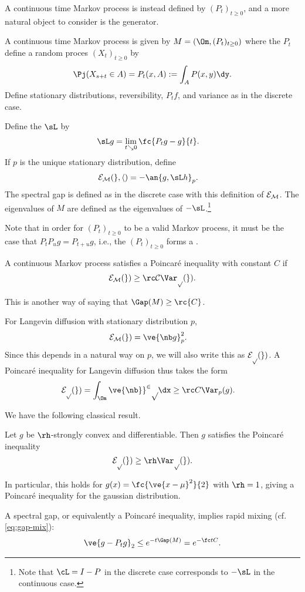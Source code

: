 A continuous time Markov process is instead defined by $(P_t)_{t\ge 0}$, and a more natural object to consider is the generator. 
\begin{df}
A continuous time Markov process is given by $M=(\Om, (P_t)_{t\ge 0})$ where the $P_t$ define a random proces $(X_t)_{t\ge 0}$ by
$$
\Pj(X_{s+t}\in A) = P_t(x,A) :=\int_A P(x,y)\dy.
$$
Define stationary distributions, reversibility, $P_tf$, and variance as in the discrete case.

Define the  $\sL$ by
\begin{align}
\sL g &= \lim_{t\searrow 0} \fc{P_t g - g}{t}.
\end{align}
If $p$ is the unique stationary distribution, define
\begin{align}
\cal E_M(g,h) &= -\an{g, \sL h}_p.
\end{align}
The spectral gap is defined as in the discrete case with this definition of $\cal E_M$. The eigenvalues of $M$ are defined as the eigenvalues of $-\sL$.\footnote{Note that $\cL=I-P$ in the discrete case corresponds to $-\sL$ in the continuous case.} 
\end{df}
Note that in order for $(P_t)_{t\ge 0}$ to be a valid Markov process, it must be the case that $P_tP_u g = P_{t+u}g$, i.e., the $(P_t)_{t\ge 0}$ forms a . 

%

\begin{df}
A continuous Markov process satisfies a Poincar\'e inequality with constant $C$ if
\begin{align}
\cal E_M(g) \ge \rc C\Var_p(g).
\end{align}
\end{df}
This is another way of saying that $\Gap(M)\ge \rc{C}$. 

For Langevin diffusion with stationary distribution $p$, 
\begin{align}
\cal E_M(g) &= \ve{\nb g}_p^2. 
\end{align}
Since this depends in a natural way on $p$, we will also write this as $\cal E_p(g)$. A Poincar\'e inequality for Langevin diffusion thus takes the form
\begin{align}
\cal E_p(g) = \int_{\Om} \ve{\nb g}^2 p\dx &\ge \rc C \Var_p(g).
\end{align}

We have the following classical result. 

\begin{thm}\label{thm:bakry-emery}
Let $g$ be $\rh$-strongly convex and differentiable. %
Then $g$ satisfies the Poincar\'e inequality
$$
\cal E_p(g) \ge \rh \Var_p(g).
$$

\end{thm}
In particular, this holds for $g(x)={\fc{\ve{x-\mu}^2}{2}}$ with $\rh = 1$, giving a Poincar\'e inequality for the gaussian distribution.

A spectral gap, or equivalently a Poincar\'e inequality, implies rapid mixing (cf. \eqref{eq:gap-mix}):
\begin{align}
\ve{g - P_t g}_2\le e^{-t\Gap(M)} = e^{-\fc tC}.
\end{align}
